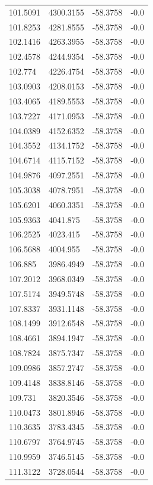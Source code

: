 \begin{table}[H]
\begin{tabular}{llll}
101.5091 & 4300.3155 & -58.3758 & -0.0 \\
101.8253 & 4281.8555 & -58.3758 & -0.0 \\
102.1416 & 4263.3955 & -58.3758 & -0.0 \\
102.4578 & 4244.9354 & -58.3758 & -0.0 \\
102.774 & 4226.4754 & -58.3758 & -0.0 \\
103.0903 & 4208.0153 & -58.3758 & -0.0 \\
103.4065 & 4189.5553 & -58.3758 & -0.0 \\
103.7227 & 4171.0953 & -58.3758 & -0.0 \\
104.0389 & 4152.6352 & -58.3758 & -0.0 \\
104.3552 & 4134.1752 & -58.3758 & -0.0 \\
104.6714 & 4115.7152 & -58.3758 & -0.0 \\
104.9876 & 4097.2551 & -58.3758 & -0.0 \\
105.3038 & 4078.7951 & -58.3758 & -0.0 \\
105.6201 & 4060.3351 & -58.3758 & -0.0 \\
105.9363 & 4041.875 & -58.3758 & -0.0 \\
106.2525 & 4023.415 & -58.3758 & -0.0 \\
106.5688 & 4004.955 & -58.3758 & -0.0 \\
106.885 & 3986.4949 & -58.3758 & -0.0 \\
107.2012 & 3968.0349 & -58.3758 & -0.0 \\
107.5174 & 3949.5748 & -58.3758 & -0.0 \\
107.8337 & 3931.1148 & -58.3758 & -0.0 \\
108.1499 & 3912.6548 & -58.3758 & -0.0 \\
108.4661 & 3894.1947 & -58.3758 & -0.0 \\
108.7824 & 3875.7347 & -58.3758 & -0.0 \\
109.0986 & 3857.2747 & -58.3758 & -0.0 \\
109.4148 & 3838.8146 & -58.3758 & -0.0 \\
109.731 & 3820.3546 & -58.3758 & -0.0 \\
110.0473 & 3801.8946 & -58.3758 & -0.0 \\
110.3635 & 3783.4345 & -58.3758 & -0.0 \\
110.6797 & 3764.9745 & -58.3758 & -0.0 \\
110.9959 & 3746.5145 & -58.3758 & -0.0 \\
111.3122 & 3728.0544 & -58.3758 & -0.0 \\

\end{tabular}
\end{table}

